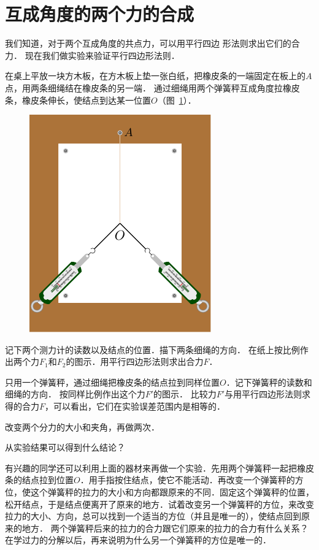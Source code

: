 \section{互成角度的两个力的合成}

我们知道，对于两个互成角度的共点力，可以用平行四边
形法则求出它们的合力．
现在我们做实验来验证平行四边形法则．
	
在桌上平放一块方木板，在方木板上垫一张白纸，把橡皮条的一端固定在板上的$A$点，用两条细绳结在橡皮条的另一端．
通过细绳用两个弹簧秤互成角度拉橡皮条，橡皮条伸长，使结点到达某一位置$O$（图~\ref{fig_A_10-7}）．
\begin{figure}[htbp]
    \centering
    \includegraphics{fig/A/10-7.pdf}
    \caption{}\label{fig_A_10-7}
\end{figure}

记下两个测力计的读数以及结点的位置．描下两条细绳的方向．
在纸上按比例作出两个力$F_1$和$F_2$的图示．用平行四边形法则求出合力$F$．

只用一个弹簧秤，通过细绳把橡皮条的结点拉到同样位置$O$．记下弹簧秤的读数和细绳的方向．
按同样比例作出这个力$F'$的图示．
比较力$F'$与用平行四边形法则求得的合力$F$，可以看出，它们在实验误差范围内是相等的．

改变两个分力的大小和夹角，再做两次．

从实验结果可以得到什么结论？

有兴趣的同学还可以利用上面的器材来再做一个实验．先用两个弹簧秤一起把橡皮条的结点拉到位置$O$．用手指按住结点，使它不能活动．再改变一个弹簧秤的方位，使这个弹簧秤的拉力的大小和方向都跟原来的不同．固定这个弹簧秤的位置，松开结点，于是结点便离开了原来的地方．试着改变另一个弹簧秤的方位，来改变拉力的大小、方向，总可以找到一个适当的方位（并且是唯一的），使结点回到原来的地方．
两个弹簧秤后来的拉力的合力跟它们原来的拉力的合力有什么关系？在学过力的分解以后，再来说明为什么另一个弹簧秤的方位是唯一的．	
	
